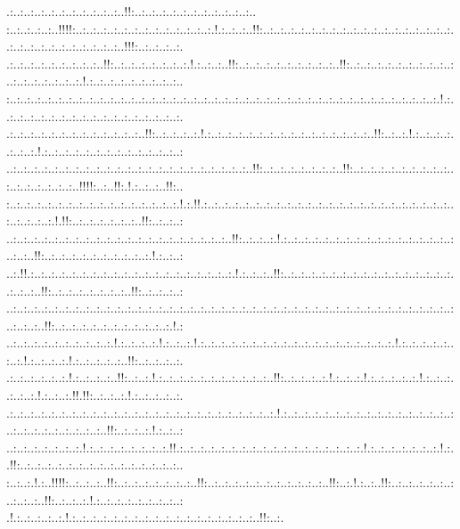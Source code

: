 \documentclass[paper=a4, fontsize=11pt]{scrartcl} %
\numberwithin{equation}{section} %
\numberwithin{figure}{section} %
\numberwithin{table}{section} %
\begin{document}
.:..:..:..:..:..:..:..:..:..:..:..!!:..:..:..:..:..:..:..:..:..:..:..:..\\:..:..:..:..:..!!!!:..:..:..:..:..:..:..:..:..:..:..:..:..:.!.:..:..:..!!:..:..:..:..:..:..:..:..:..:..:..:..:..:..:..:..:..:..:..:..:..:..:..:..:..:..:..:..:..:..!!!:..:..:..:..:.\\.:..:..:..:..:..:..:..:..:..!!:..:..:..:..:..:..:..:.!.:..:..:..!!:..:..:..:..:..:..:..:..:..:..!!:..:..:..:..:..:..:..:..:..:..:..:..:..:..:..:..:..:.!.:..:..:..:..:..:..:..:..:..\\:..:..:..:..:..:..:..:..:..:..:..:..:..:..:..:..:..:..:..:..:..:..:..:..:..:..:..:..:..:..:..:..:..:..:..:..:..:..:..:..:..:.!.:..:..:..:..:..:..:..:..:..:..:..:..:..:..:..:..:..:.\\.:..:..:..:..:..:..:..:..:..:..:..:..:..!!:..:..:..:..:.!.:..:..:..:..:..:..:..:..:..:..:..:..:..:..:..:..!!:..:..:.!.:..:..:..:..:..:..:.!.:..:..:..:..:..:..:..:..:..:..:..:..:..:\\..:..:..:..:..:..:..:..:..:..:..:..:..:..:..:..:..:..:..:..:..:..:..:..!!:..:..:..:..:..:..:..:..!!:..:..:..:..:..:..:..:..:..:..:..:..:..:..:..:..:..!!!!:..:..!!:.!.:..:..:..!!:..\\:..:..:..:..:..:..:..:..:..:..:..:..:..:..:..:..:.!.:.!!.:..:..:..:..:..:..:..:..:..:..:..:..:..:..:..:..:..:..:..:..:..:..:..:..:..:..:..:..:.!.!!:..:..:..:..:..:..:..!!:..:..:..:\\..:..:..:..:..:..:..:..:..:..:..:..:..:..:..:..:..:..:..:..:..:..!!:..:..:..:.!.:..:..:..:..:..:..:..:..:..:..:..:..:..:..:..:..:..:..:..!!:..:..:..:..:..:..:..:..:..:..:.!.:..:..:\\..:.!!.:..:..:..:..:..:..:..:..:..:..:..:..:..:..:..:..:..:..:..:.!.:..:..:..!!:..:..:..:..:..:..:..:..:..:..:..:..:..:..:..:..:..:..:..:..!!:..:..:..:..:..:..:..:..!!:..:..:..:..:\\..:..:..:..:..:..:..:..:..:..:..:..:..:..:..:..:..:..:..:..:..:..:..:..:..:..:..:..:..:..:..:..:..:..:..:..:..:..:..:..:..:..:..:..:..:..:..!!:..:..:..:..:..:..:..:..:..:..:..:.!.:\\..:..:..:..:..:..:..:..:..:..:.!.:..:..:..:.!.:..:..:.!.:..:..:..:..:..:..:..:..:..:..:..:..:..:..:..:..:..:..:.!.:..:..:..:..:..:..:.!.:..:..:..:.!.:..:..:..:..:..!!:..:..:..:..:.\\.:..:..:..:..:..:.!.:..:..:..:..!!:..:..:.!.:..:..:..:..:..:..:..:..:..:..:..!!:..:..:..:..:.!.:..:..:.!.:..:..:..:..:.!.:..:..:..:..:..:.!.:..:..:.!!.!!:..:..:..:.!.:..:..:..:..:.\\.:..:..:..:..:..:..:..:..:..:..:..:..:..:..:..:..:..:..:..:..:..:..:..:..:..:.!.:..:..:..:..:..:..:..:..:..:..:..:..:..:..:..:..:..:..:..:..:..:..:..:..:..:..!!:..:..:..:.!.:..:..:\\..:..:..:..:..:..:..:.!.:..:..:..:..:..:..:..:.!!.:..:..:..:..:..:..:..:..:..:..:..:..:..:..:..:..:..:.!.:..:..:..:..:..:..:.!.:..!!:..:..:..:..:..:..:..:..:..:..:..:..:..:..:..:..\\:..:..:.!.:..!!!!:..:..:..:..!!:..:..:..:..:..:..:..:..!!:..:..:..:..:..:..:..:..:..:..:..:..!!:..:.!.:..:..!!:..:..:..:..:..:..:..:..:..:..!!:..:..:..:.!.:..:..:..:..:..:..:..:..:\\.!.:..:..:..:..:.!.:..:..:..:..:..:..:..:..:..:..:..:..:..:..:..:..:..:..!!:..:.
\end{document}
